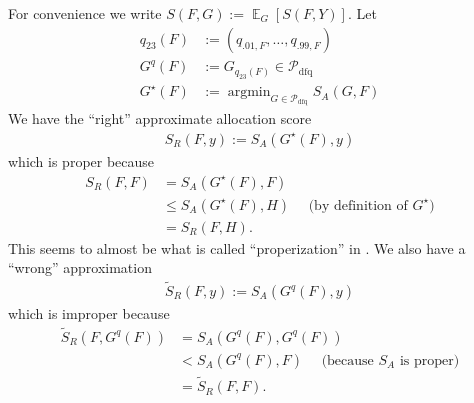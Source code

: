 \documentclass{article}
\DeclareMathOperator*{\argmin}{argmin}
\DeclareMathOperator{\Ex}{\mathbb{E}}
\begin{document}
For convenience we write $S(F,G) := \Ex_G[S(F,Y)]$. Let
\begin{align*}
q_{23}(F) &:= (q_{.01,F},\ldots,q_{.99,F}) \\
G^q(F) &:= G_{q_{23}(F)} \in \mathcal{P}_{\mathrm{dfq}} \\
G^{\star}(F) &:= \argmin_{G \in \mathcal{P}_{\mathrm{dfq}}} S_A(G,F)
\end{align*}
We have the ``right'' approximate allocation score
\begin{align*}
S_{R}(F,y):= S_A(G^{\star}(F),y)
\end{align*}
which is proper because
\begin{align*}
S_R(F,F) &= S_A(G^{\star}(F), F) \\
&\leq S_A(G^{\star}(F), H) \quad \text{ (by definition of $G^{\star}$)} \\
&=S_R(F,H).
\end{align*}
This seems to almost be what is called ``properization'' in \cite{brehmer2020properization}.
We also have a ``wrong'' approximation
\begin{align*}
\tilde{S}_R(F,y) := S_A(G^q(F),y)
\end{align*}
which is improper because
\begin{align*}
\tilde{S}_R(F,G^q(F)) &= S_A(G^q(F),G^q(F)) \\
 &<  S_A(G^q(F),F) \quad \text{ (because $S_A$ is proper)} \\
 &= \tilde{S}_R(F,F).
\end{align*}






\end{document}
